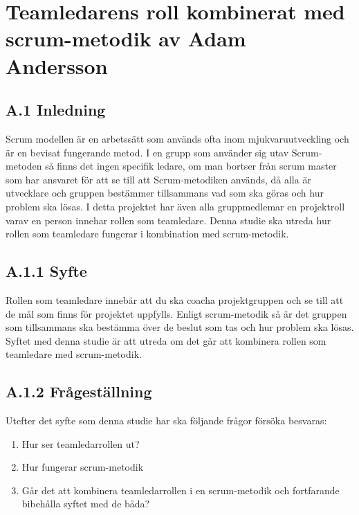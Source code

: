 \chapter{Teamledarens roll kombinerat med scrum-metodik av Adam Andersson}

\section{A.1 Inledning}
Scrum modellen är en arbetssätt som används ofta inom mjukvaruutveckling och är en bevisat fungerande metod. I en grupp som använder sig utav Scrum-metoden så finns det ingen specifik ledare, om man bortser från scrum master som har ansvaret för att se till att Scrum-metodiken används, då alla är utvecklare och gruppen bestämmer tillsammans vad som ska göras och hur problem ska lösas.
I detta projektet har även alla gruppmedlemar en projektroll varav en person innehar rollen som teamledare. Denna studie ska utreda hur rollen som teamledare fungerar i kombination med scrum-metodik.

\section{A.1.1 Syfte}
Rollen som teamledare innebär att du ska coacha projektgruppen och se till att de mål som finns för projektet uppfylls. Enligt scrum-metodik så är det gruppen som tillsammans ska bestämma över de beslut som tas och hur problem ska lösas. Syftet med denna studie är att utreda om det går att kombinera rollen som teamledare med scrum-metodik.

\section{A.1.2 Frågeställning}
Utefter det syfte som denna studie har ska följande frågor försöka besvaras:

\begin{enumerate}
	\item Hur ser teamledarrollen ut?
	\item Hur fungerar scrum-metodik
	\item Går det att kombinera teamledarrollen i en scrum-metodik och fortfarande bibehålla syftet med de båda? 
\end{enumerate}

